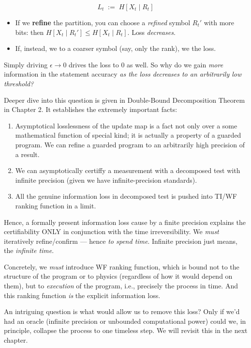 \documentclass[12pt]{article}
\theoremstyle{definition}
\theoremstyle{plain}
\begin{document}
$$
L_t \;:=\; H[X_t \mid R_t]
$$

\begin{itemize}
    \item If we \textbf{refine} the partition, you can choose a \textit{refined} symbol $R_t'$ with more bits: then $H[X_t\mid R_t'] \le H[X_t\mid R_t]$. Loss \textit{decreases}.
    \item If, instead, we  to a coarser symbol (say, only the rank), we  the loss.
\end{itemize}
Simply driving \(\epsilon \rightarrow 0\) drives the loss to $0$ as well. So why do we gain \emph{more} information in the statement accuracy \emph{as the loss decreases to an arbitrarily low threshold?}

Deeper dive into this question is given in Double-Bound Decomposition Theorem in Chapter 2. It establishes the extremely important facts:
\begin{enumerate}
    \item Asymptotical losslessness of the update map is a fact not only over a some mathematical function of special kind; it is actually a property of a guarded program. We can refine a guarded program to an arbitrarily high precision of a result.
    \item We can asymptotically certiffy a measurement with a decomposed test with infinite precision (given we have infinite-precision standards).
    \item All the genuine information loss in decomposed test is pushed into TI/WF ranking function in a limit.
\end{enumerate}
Hence, a formally present information loss cause by a finite precision explains the certifiability ONLY in conjunction with the time irreversibility. We \emph{must} iteratively refine/confirm — hence \emph{to spend time}. Infinite precision just means, the \emph{infinite time}.

Concretely, we \emph{must} introduce WF ranking function, which is bound not to the structure of the program or to physics (regardless of how it would depend on them), but to \emph{execution} of the program, i.e., precisely the process in time. And this ranking function \emph{is} the explicit information loss.

An intriguing question is what would allow us to remove this loss? Only if we'd had an oracle (infinite precision or unbounded computational power) could we, in principle, collapse the process to one timeless step. We will revisit this in the next chapter.
\end{document}
